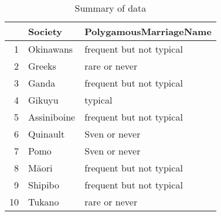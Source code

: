 \begin{table}[ht]
\centering
\begin{tabular}{rll}
  \hline
 & Society & PolygamousMarriageName \\ 
  \hline
1 & Okinawans & frequent but not typical \\ 
  2 & Greeks & rare or never \\ 
  3 & Ganda & frequent but not typical \\ 
  4 & Gikuyu & typical \\ 
  5 & Assiniboine & frequent but not typical \\ 
  6 & Quinault & Sven or never \\ 
  7 & Pomo & Sven or never \\ 
  8 & Māori & frequent but not typical \\ 
  9 & Shipibo & frequent but not typical \\ 
  10 & Tukano & rare or never \\ 
   \hline
\end{tabular}
\caption{Summary of data} 
\end{table}
